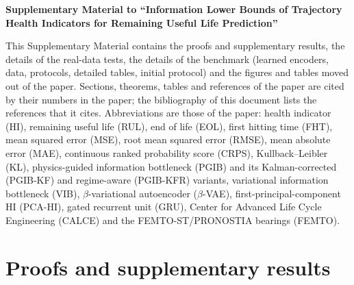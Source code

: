 \documentclass[preprint,12pt]{elsarticle}
\theoremstyle{definition}
\begin{document}
\begin{center}\textbf{Supplementary Material to ``Information Lower Bounds of Trajectory Health Indicators for Remaining Useful Life Prediction''}\end{center}
\noindent This Supplementary Material contains the proofs and supplementary results, the details of the real-data tests, the details of the benchmark (learned encoders, data, protocols, detailed tables, initial protocol) and the figures and tables moved out of the paper. Sections, theorems, tables and references of the paper are cited by their numbers in the paper; the bibliography of this document lists the references that it cites. Abbreviations are those of the paper: health indicator (HI), remaining useful life (RUL), end of life (EOL), first hitting time (FHT), mean squared error (MSE), root mean squared error (RMSE), mean absolute error (MAE), continuous ranked probability score (CRPS), Kullback--Leibler (KL), physics-guided information bottleneck (PGIB) and its Kalman-corrected (PGIB-KF) and regime-aware (PGIB-KFR) variants, variational information bottleneck (VIB), $\beta$-variational autoencoder ($\beta$-VAE), first-principal-component HI (PCA-HI), gated recurrent unit (GRU), Center for Advanced Life Cycle Engineering (CALCE) and the FEMTO-ST/PRONOSTIA bearings (FEMTO).

\renewcommand{\thesection}{S\arabic{section}}
\renewcommand{\thetable}{S\arabic{table}}
\renewcommand{\thefigure}{S\arabic{figure}}
\renewcommand{\theequation}{S\arabic{equation}}
\setcounter{proposition}{2}\setcounter{remark}{2}
\section{Proofs and supplementary results}
\label{app:proofs}
\end{document}
